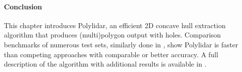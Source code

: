 \paragraph{Conclusion}
This chapter introduces Polylidar, an efficient 2D concave hull extraction algorithm that produces (multi)polygon output with holes. Comparison benchmarks of numerous test sets, similarly done in \cite{duckham_efficient_2008}, show Polylidar is faster than competing approaches with comparable or better accuracy. A full description of the algorithm with additional results is available in \cite{castagno_polylidar_2020}.









